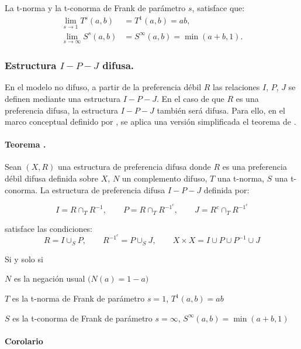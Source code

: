 \documentclass[a5paper,doc,10pt,noapacite]{apa6}
\begin{document}
{{La t-norma y la t-conorma de Frank de parámetro \(s\), satisface que:
    \begin{align*}
    	\lim _{s \rightarrow 1} T^s(a,b) & = T^1(a,b)  = ab,	\\
    	\lim _{s \rightarrow \infty} S^s(a,b) & = S^{\infty} (a,b)  = \min (a+b,1).
    \end{align*}  

\subsubsection{Estructura \(I-P-J\) difusa.}

En el modelo no difuso, a partir de la preferencia débil \(R\) las relaciones \(I\), \(P\), \(J\) se definen mediante una estructura \(I-P-J\). En el caso de que \(R\) es una preferencia difusa, la estructura \(I-P-J\) también será difusa. Para ello, en el marco conceptual definido por , se aplica una versión simplificada el teorema de .

\paragraph{Teorema \cite{Alsina-1985}.}

Sean \((X,R)\) una estructura de preferencia difusa donde \(R\) es una preferencia débil difusa definida sobre \(X\), \(N\) un complemento difuso, \(T\) una t-norma, \(S\) una t-conorma. La estructura de preferencia difusa \(I-P-J\) definida por:

\[
	I = R \cap_T R^{-1}, \qquad P = R \cap_T R^{{-1}^c}, \qquad J = R^{c} \cap_T R^{{-1}^c}
\]

satisface las condiciones:
\[
	R = I \cup_S P, \qquad R^{{-1}^c} = P \cup_S J, \qquad X \times X = I \cup P \cup P^{-1} \cup J 
\]

Si y solo si

\begin{APAitemize}
    \item \(N\) es la negación usual \(\big(N(a) = 1-a\big)\)
    \item \(T\) es la t-norma de Frank de parámetro \(s = 1\), \(T^1(a,b) = ab\)
    \item \(S\) es la t-conorma de Frank de parámetro \(s = \infty\), \(S^{\infty}(a,b) = \min(a+b, 1)\)
\end{APAitemize}

\paragraph{Corolario}

}}
\end{document}
